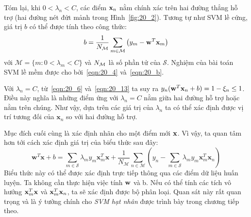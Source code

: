 Tóm lại, khi $0 < \lambda_n < C$, các điểm $\mathbf{x}_n$ nằm chính xác trên hai đường thẳng hỗ trợ (hai đường nét đứt mảnh trong Hình~\ref{fig:20_2}). Tương tự
như SVM lề cứng, giá trị $b$ có thể được tính theo công thức:
\begin{equation}
\label{eqn:20_b}
b = \frac{1}{N_{\mathcal{M}}} \sum_{m\in \mathcal{M}}\left(y_m -
\mathbf{w}^T\mathbf{x}_m\right)
\end{equation}
với $\mathcal{M} = \{m: 0 < \lambda_m < C\}$ và $N_{\mathcal{M}}$ là số phần tử của
$\mathcal{S}$.
Nghiệm của bài toán SVM lề mềm được cho bởi~\eqref{eqn:20_4}
và~\eqref{eqn:20_b}.

Với $\lambda_n = C$, từ~\eqref{eqn:20_6} và~\eqref{eqn:20_13} ta suy ra $y_n(\mathbf{w}^T\mathbf{x}_n + b) = 1 - \xi_n \leq 1$. Điều này nghĩa là những điểm ứng với $\lambda_n = C$ nằm
giữa hai đường hỗ trợ hoặc nằm trên chúng.
Như vậy, dựa trên các giá trị của $\lambda_n$ ta có thể xác định được vị trí
tương đối của $\mathbf{x}_n$ so với hai đường hỗ trợ.


Mục đích cuối cùng là xác định nhãn cho một điểm mới $\mathbf{x}$. Vì vậy, ta quan tâm hơn tới cách xác định giá
trị
của biểu thức sau đây:
\begin{equation}
\mathbf{w}^T\mathbf{x} + b = \sum_{m \in \mathcal{S}} \lambda_m y_m \mathbf{x}_m^T \mathbf{x} + \frac{1}{N_{\mathcal{M}}} \sum_{n \in \mathcal{M}} \left(y_n - \sum_{m \in \mathcal{S}} \lambda_m y_m \mathbf{x}_m^T\mathbf{x}_n\right)
\end{equation}
Biểu thức này có thể được xác định trực tiếp thông qua các điểm dữ liệu huấn luyện. Ta không cần thực hiện việc tính $\mathbf{w}$ và b. Nếu có thể tính các tích vô hướng $\mathbf{x}_m^T\mathbf{x}$ và
$\mathbf{x}_m^T\mathbf{x}_n$, ta sẽ xác định được bộ phân loại. Quan sát này rất quan trọng và là ý tưởng chính cho \textit{SVM hạt nhân} được trình bày trong chương tiếp theo.


